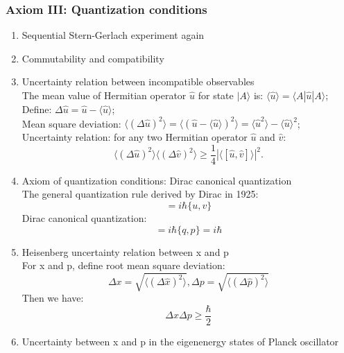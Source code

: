 \documentclass[12pt]{article}
\numberwithin{equation}{section}
\begin{document}
\subsubsection{Axiom III: Quantization conditions}
\begin{enumerate}
\item Sequential Stern-Gerlach experiment again
\item Commutability and compatibility
\item Uncertainty relation between incompatible observables \\
	The mean value of Hermitian operator $\hat{u}$ for state $|A\rangle$ is: $\langle\hat{u}\rangle=\langle A|\hat{u}|A\rangle$; \\
	Define: $\Delta \hat{u}=\hat{u}-\langle\hat{u}\rangle$; \\
	Mean square deviation: $\langle(\Delta \hat{u})^2\rangle=\langle(\hat{u}-\langle\hat{u}\rangle)^2\rangle=\langle\hat{u}^2\rangle-\langle\hat{u}\rangle^2$; \\
	Uncertainty relation: for any two Hermitian operator $\hat{u}$ and $\hat{v}$: 
	\begin{equation}
	\langle (\Delta \hat{u})^2\rangle\langle(\Delta \hat{v})^2\rangle \geq \frac{1}{4}|\langle[\hat{u},\hat{v}]\rangle|^2.
	\end{equation}
\item Axiom of quantization conditions: Dirac canonical quantization \\
	The general quantization rule derived by Dirac in 1925:
	\begin{equation}[\hat{u},\hat{v}]=i\hbar \{u, v\}\end{equation}
	Dirac canonical quantization:
	\begin{equation}[\hat{q},\hat{p}]=i\hbar \{q, p\}=i\hbar\end{equation}
\item Heisenberg uncertainty relation between x and p \\
	For x and p, define root mean square deviation:
	\begin{equation}\Delta x=\sqrt{\langle(\Delta \hat{x})^2 \rangle}, \Delta p=\sqrt{\langle(\Delta \hat{p})^2 \rangle}\end{equation}
	Then we have:
	\begin{equation}\Delta x \Delta p \geq \frac{\hbar}{2}\end{equation}
\item Uncertainty between x and p in the eigenenergy states of Planck oscillator \\

\end{enumerate}
\end{document}
